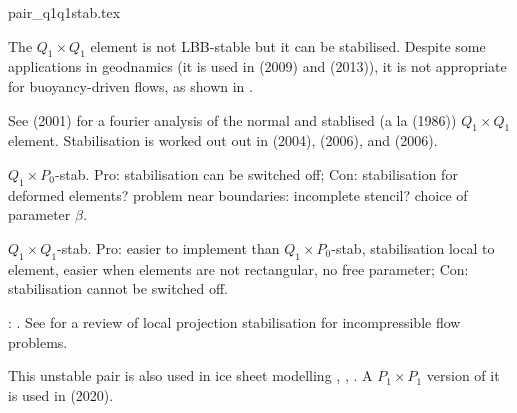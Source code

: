\begin{flushright} {\tiny {\color{gray} pair\_q1q1stab.tex}} \end{flushright}

\begin{minipage}[t]{0.5\textwidth}

\end{minipage}
\begin{minipage}[t]{0.5\textwidth}

\end{minipage}

The $Q_1\times Q_1$ element is not LBB-stable but it can be stabilised. Despite
some applications in geodnamics (it is used in \textcite{bugs09} (2009) 
and \textcite{busa13} (2013)), it is not appropriate for buoyancy-driven flows, 
as shown in \textcite{thba22}.

See \textcite{nosi01} (2001) for a fourier analysis of the normal 
and stablised (a la \textcite{hufb86} (1986)) $Q_1\times Q_1$ element.
Stabilisation is worked out out in \textcite{dobo04} (2004), \textcite{bodg06} (2006), 
and \textcite{bodo06} (2006).

$Q_1\times P_0$-stab. Pro: stabilisation can be switched off; Con: stabilisation for deformed elements? 
problem near boundaries: incomplete stencil? choice of parameter $\beta$.

$Q_1\times Q_1$-stab. Pro: easier to implement than $Q_1\times P_0$-stab, stabilisation local to element, easier when elements are not rectangular, no free parameter; Con: stabilisation cannot be switched off.

\Literature: \textcite{shry78,temr92,tezd92,grcc95,idsn95,knto00,fros07,lihc09}. 
See \textcite{brlu09} for a review of local projection stabilisation for incompressible flow problems. 

This unstable pair is also used in ice sheet modelling \textcite{heah18} , \textcite{zhjg11}, 
\textcite{zwgg07}. A $P_1\times P_1$ version of it is used in \textcite{kahp20} (2020).
